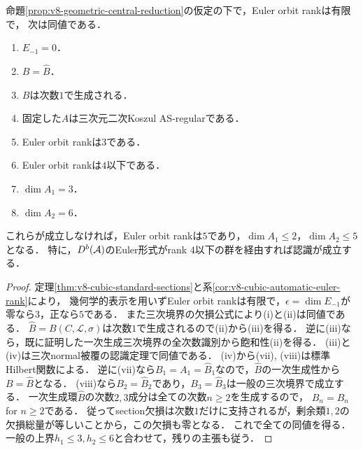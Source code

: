 \documentclass[11pt,a4paper]{ltjsarticle}
\begin{document}
\begin{corollary}[通常の曲線表示の下で残る一つの障害]
\label{cor:v8-geometric-one-obstruction}
命題\ref{prop:v8-geometric-central-reduction}の仮定の下で，Euler orbit rankは有限で，
次は同値である．
\begin{enumerate}[label=(\roman*)]
\item $E_{-1}=0$．
\item $B=\widehat B$．
\item $B$は次数$1$で生成される．
\item 固定した$A$は三次元二次Koszul AS-regularである．
\item Euler orbit rankは$3$である．
\item Euler orbit rankは$4$以下である．
\item $\dim A_1=3$．
\item $\dim A_2=6$．
\end{enumerate}
これらが成立しなければ，Euler orbit rankは$5$であり，$\dim A_1\leq2$，$\dim A_2\leq5$となる．
特に，$D^b(\mathcal A)$のEuler形式がrank $4$以下の群を経由すれば認識が成立する．
\end{corollary}
\begin{proof}
定理\ref{thm:v8-cubic-standard-sections}と系\ref{cor:v8-cubic-automatic-euler-rank}により，
幾何学的表示を用いずEuler orbit rankは有限で，$\epsilon=\dim E_{-1}$が零なら$3$，正なら$5$である．
また三次境界の欠損公式により(i)と(ii)は同値である．
$\widehat B=B(C,\mathcal L,\sigma)$は次数$1$で生成されるので(ii)から(iii)を得る．
逆に(iii)なら，既に証明した一次生成三次境界の全次数識別から飽和性(ii)を得る．
(iii)と(iv)は三次normal被覆の認識定理で同値である．
(iv)から(vii), (viii)は標準Hilbert関数による．
逆に(vii)なら$B_1=A_1=\widehat B_1$なので，$\widehat B$の一次生成性から$B=\widehat B$となる．
(viii)なら$B_2=\widehat B_2$であり，$B_3=\widehat B_3$は一般の三次境界で成立する．
一次生成環$\widehat B$の次数$2,3$成分は全ての次数$n\geq2$を生成するので，
$B_n=\widehat B_n$ for $n\geq2$である．
従ってsection欠損は次数$1$だけに支持されるが，剰余類$1,2$の欠損総量が等しいことから，この欠損も零となる．
これで全ての同値を得る．一般の上界$h_1\leq3,h_2\leq6$と合わせて，残りの主張も従う．
\end{proof}
\end{document}

